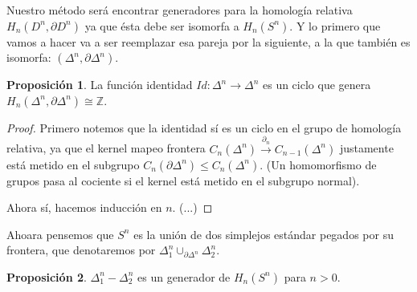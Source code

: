 \documentclass[spanish]{book}
\theoremstyle{definition}
\newtheorem*{prop}{Proposición}
\newcommand{\Z}{\mathbb{Z}}
\begin{document}
	Nuestro método será encontrar generadores para la homología relativa $H_n(D^n,\partial D^n)$ ya que ésta debe ser isomorfa a $H_n(S^n)$. Y lo primero que vamos a hacer va a ser reemplazar esa pareja por la siguiente, a la que también es isomorfa: $(\Delta^n,\partial\Delta^n)$.
\begin{prop}
	 La función identidad $Id:\Delta^n\to\Delta^n$ es un ciclo que genera $H_n(\Delta^n,\partial\Delta^n)\cong\Z$.
	 \begin{proof}
	 	Primero notemos que la identidad sí es un ciclo en el grupo de homología relativa, ya que el kernel mapeo frontera $C_n(\Delta^n)\xrightarrow{\partial_n}C_{n-1}(\Delta^n)$ justamente está metido en el subgrupo $C_n(\partial\Delta^n)\leq C_n(\Delta^n)$. (Un homomorfismo de grupos pasa al cociente si el kernel está metido en el subgrupo normal).
	 	
	 	Ahora sí, hacemos inducción en $n$. (...)
	 	
%	 	
%	 	
	 \end{proof}
\end{prop}
	Ahoara pensemos que $S^n$ es la unión de dos simplejos estándar pegados por su frontera, que denotaremos por $\Delta_1^n\cup_{\partial\Delta^n}\Delta_2^n$.
\begin{prop}
	$\Delta^n_1-\Delta^n_2$ es un generador de $H_n(S^n)$ para $n>0$.
\end{prop}
\end{document}
